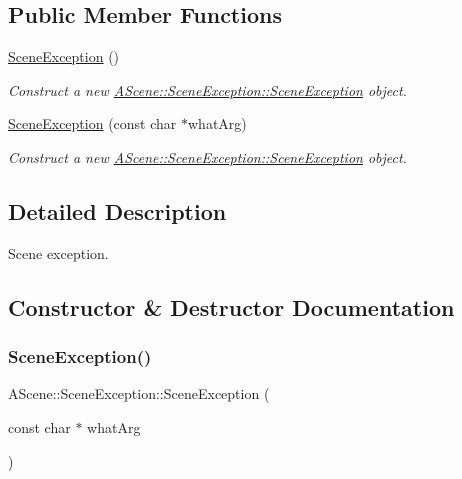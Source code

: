 \subsection*{Public Member Functions}
\begin{DoxyCompactItemize}
\item 
\mbox{\label{class_a_scene_1_1_scene_exception_a43d2393247e90fabeeb049deac61119c}} 
\hyperlink{class_a_scene_1_1_scene_exception_a43d2393247e90fabeeb049deac61119c}{Scene\+Exception} ()
\begin{DoxyCompactList}\small\item\em Construct a new \hyperlink{class_a_scene_1_1_scene_exception_a43d2393247e90fabeeb049deac61119c}{A\+Scene\+::\+Scene\+Exception\+::\+Scene\+Exception} object. \end{DoxyCompactList}\item 
\hyperlink{class_a_scene_1_1_scene_exception_a7f1466d058828800519b4f3baf118f61}{Scene\+Exception} (const char $\ast$what\+Arg)
\begin{DoxyCompactList}\small\item\em Construct a new \hyperlink{class_a_scene_1_1_scene_exception_a43d2393247e90fabeeb049deac61119c}{A\+Scene\+::\+Scene\+Exception\+::\+Scene\+Exception} object. \end{DoxyCompactList}\end{DoxyCompactItemize}


\subsection{Detailed Description}
Scene exception. 

\subsection{Constructor \& Destructor Documentation}
\mbox{\label{class_a_scene_1_1_scene_exception_a7f1466d058828800519b4f3baf118f61}} 
\subsubsection{\texorpdfstring{Scene\+Exception()}{SceneException()}}
{\footnotesize\ttfamily A\+Scene\+::\+Scene\+Exception\+::\+Scene\+Exception (\begin{DoxyParamCaption}\item[{const char $\ast$}]{what\+Arg }\end{DoxyParamCaption})\hspace{0.3cm}{\ttfamily [explicit]}}



